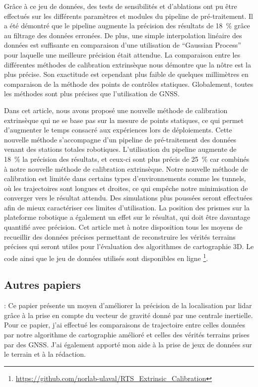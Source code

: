 Grâce à ce jeu de données, des tests de sensibilités et d'ablations ont pu être effectués sur les différents paramètres et modules du pipeline de pré-traitement.
Il a été démontré que le pipeline augmente la précision des résultats de \SI{18}{\%} grâce au filtrage des données erronées.
De plus, une simple interpolation linéaire des données est suffisante en comparaison d'une utilisation de ``Gaussian Process'' pour laquelle une meilleure précision était attendue.
La comparaison entre les différentes méthodes de calibration extrinsèque nous démontre que la nôtre est la plus précise.
Son exactitude est cependant plus faible de quelques millimètres en comparaison de la méthode des points de contrôles statiques.
Globalement, toutes les méthodes sont plus précises que l'utilisation de \ac{GNSS}.

Dans cet article, nous avons proposé une nouvelle méthode de calibration extrinsèque qui ne se base pas sur la mesure de points statiques, ce qui permet d'augmenter le temps consacré aux expériences lors de déploiements.
Cette nouvelle méthode s'accompagne d'un pipeline de pré-traitement des données venant des stations totales robotiques. 
L'utilisation du pipeline augmente de \SI{18}{\%} la précision des résultats, et ceux-ci sont plus précis de \SI{25}{\%} car combinés à notre nouvelle méthode de calibration extrinsèque.
Notre nouvelle méthode de calibration est limitée dans certains types d'environnements comme les tunnels, où les trajectoires sont longues et droites, ce qui empêche notre minimisation de converger vers le résultat attendu.
Des simulations plus poussées seront effectuées afin de mieux caractériser ces limites d'utilisation.
La position des prismes sur la plateforme robotique a également un effet sur le résultat, qui doit être davantage quantifié avec précision. 
Cet article met à notre disposition tous les moyens de recueillir des données précises permettant de reconstruire les vérités terrains précises qui seront utiles pour l'évaluation des algorithmes de cartographie 3D.
Le code ainsi que le jeu de données utilisés sont disponibles en ligne \footnote{\url{https://github.com/norlab-ulaval/RTS_Extrinsic_Calibration}}.

\subsection{Autres papiers}

\textbf{}: 
Ce papier présente un moyen d'améliorer la précision de la localisation par lidar grâce à la prise en compte du vecteur de gravité donné par une centrale inertielle. 
Pour ce papier, j'ai effectué les comparaisons de trajectoire entre celles données par notre algorithme de cartographie amélioré et celles des vérités terrains prises par des \ac{GNSS}. 
J'ai également apporté mon aide à la prise de jeux de données sur le terrain et à la rédaction.
\\

